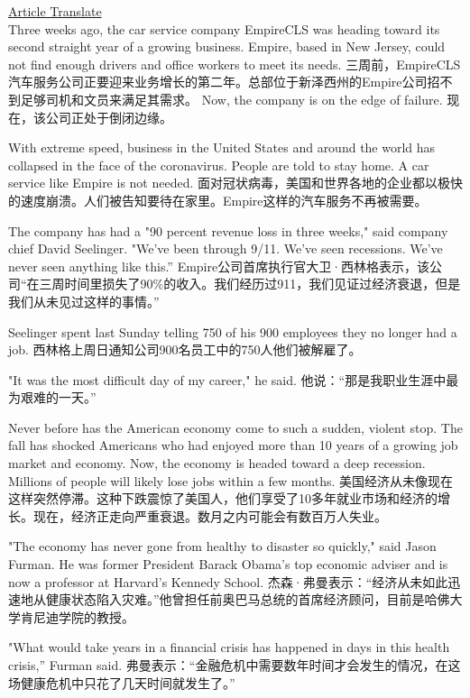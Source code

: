 \href{}{Article Translate} \\

Three weeks ago, the car service company EmpireCLS was heading toward its second straight year of a growing business. Empire, based in New Jersey, could not find enough drivers and office workers to meet its needs.
三周前，EmpireCLS汽车服务公司正要迎来业务增长的第二年。总部位于新泽西州的Empire公司招不到足够司机和文员来满足其需求。
Now, the company is on the edge of failure.
现在，该公司正处于倒闭边缘。

With extreme speed, business in the United States and around the world has collapsed in the face of the coronavirus. People are told to stay home. A car service like Empire is not needed.
面对冠状病毒，美国和世界各地的企业都以极快的速度崩溃。人们被告知要待在家里。Empire这样的汽车服务不再被需要。

The company has had a "90 percent revenue loss in three weeks," said company chief David Seelinger. "We've been through 9/11. We've seen recessions. We've never seen anything like this.''
Empire公司首席执行官大卫·西林格表示，该公司“在三周时间里损失了90\%的收入。我们经历过911，我们见证过经济衰退，但是我们从未见过这样的事情。”

Seelinger spent last Sunday telling 750 of his 900 employees they no longer had a job.
西林格上周日通知公司900名员工中的750人他们被解雇了。

"It was the most difficult day of my career," he said.
他说：“那是我职业生涯中最为艰难的一天。”

Never before has the American economy come to such a sudden, violent stop. The fall has shocked Americans who had enjoyed more than 10 years of a growing job market and economy. Now, the economy is headed toward a deep recession. Millions of people will likely lose jobs within a few months.
美国经济从未像现在这样突然停滞。这种下跌震惊了美国人，他们享受了10多年就业市场和经济的增长。现在，经济正走向严重衰退。数月之内可能会有数百万人失业。

"The economy has never gone from healthy to disaster so quickly," said Jason Furman. He was former President Barack Obama's top economic adviser and is now a professor at Harvard's Kennedy School.
杰森·弗曼表示：“经济从未如此迅速地从健康状态陷入灾难。”他曾担任前奥巴马总统的首席经济顾问，目前是哈佛大学肯尼迪学院的教授。

"What would take years in a financial crisis has happened in days in this health crisis,'' Furman said.
弗曼表示：“金融危机中需要数年时间才会发生的情况，在这场健康危机中只花了几天时间就发生了。”

